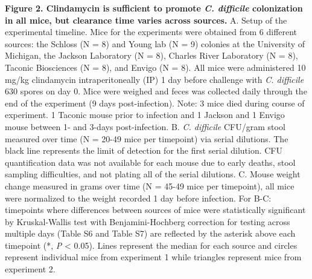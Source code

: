 \documentclass[
  11pt,
]{article}
\begin{document}
\textbf{Figure 2. Clindamycin is sufficient to promote \emph{C.
difficile} colonization in all mice, but clearance time varies across
sources.} A. Setup of the experimental timeline. Mice for the
experiments were obtained from 6 different sources: the Schloss (N = 8)
and Young lab (N = 9) colonies at the University of Michigan, the
Jackson Laboratory (N = 8), Charles River Laboratory (N = 8), Taconic
Biosciences (N = 8), and Envigo (N = 8). All mice were administered 10
mg/kg clindamycin intraperitoneally (IP) 1 day before challenge with
\emph{C. difficile} 630 spores on day 0. Mice were weighed and feces was
collected daily through the end of the experiment (9 days
post-infection). Note: 3 mice died during course of experiment. 1
Taconic mouse prior to infection and 1 Jackson and 1 Envigo mouse
between 1- and 3-days post-infection. B. \emph{C. difficile} CFU/gram
stool measured over time (N = 20-49 mice per timepoint) via serial
dilutions. The black line represents the limit of detection for the
first serial dilution. CFU quantification data was not available for
each mouse due to early deaths, stool sampling difficulties, and not
plating all of the serial dilutions. C. Mouse weight change measured in
grams over time (N = 45-49 mice per timepoint), all mice were normalized
to the weight recorded 1 day before infection. For B-C: timepoints where
differences between sources of mice were statistically significant by
Kruskal-Wallis test with Benjamini-Hochberg correction for testing
across multiple days (Table S6 and Table S7) are reflected by the
asterisk above each timepoint (*, \emph{P} \textless{} 0.05). Lines
represent the median for each source and circles represent individual
mice from experiment 1 while triangles represent mice from experiment 2.

\newpage
\end{document}
